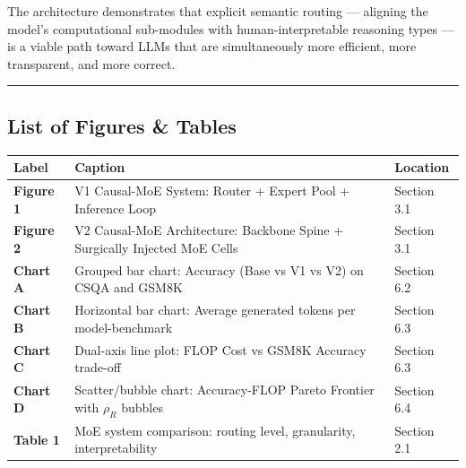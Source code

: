 The architecture demonstrates that explicit semantic routing ---
aligning the model's computational sub-modules with human-interpretable
reasoning types --- is a viable path toward LLMs that are simultaneously
more efficient, more transparent, and more correct.

\begin{center}\rule{0.5\linewidth}{0.5pt}\end{center}

\subsection{List of Figures \& Tables}\label{list-of-figures-tables}

{\def\LTcaptype{none} %
\begin{longtable}[]{@{}
  >{\raggedright\arraybackslash}p{}
  >{\raggedright\arraybackslash}p{}
  >{\raggedright\arraybackslash}p{}@{}}
\toprule\noalign{}
\begin{minipage}[b]{\linewidth}\raggedright
Label
\end{minipage} & \begin{minipage}[b]{\linewidth}\raggedright
Caption
\end{minipage} & \begin{minipage}[b]{\linewidth}\raggedright
Location
\end{minipage} \\
\midrule\noalign{}
\endhead
\bottomrule\noalign{}
\endlastfoot
\textbf{Figure 1} & V1 Causal-MoE System: Router + Expert Pool +
Inference Loop & Section 3.1 \\
\textbf{Figure 2} & V2 Causal-MoE Architecture: Backbone Spine +
Surgically Injected MoE Cells & Section 3.1 \\
\textbf{Chart A} & Grouped bar chart: Accuracy (Base vs V1 vs V2) on
CSQA and GSM8K & Section 6.2 \\
\textbf{Chart B} & Horizontal bar chart: Average generated tokens per
model-benchmark & Section 6.3 \\
\textbf{Chart C} & Dual-axis line plot: FLOP Cost vs GSM8K Accuracy
trade-off & Section 6.3 \\
\textbf{Chart D} & Scatter/bubble chart: Accuracy-FLOP Pareto Frontier
with \(\rho_R\) bubbles & Section 6.4 \\
\textbf{Table 1} & MoE system comparison: routing level, granularity,
interpretability & Section 2.1 \\

\end{longtable}}

